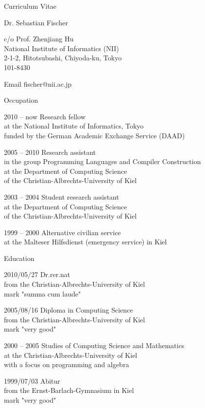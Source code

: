 \documentclass[a4paper,12pt,DIV=12]{scrartcl}
\begin{document}
\begin{cv}{Curriculum Vitae}
  \begin{cvlist}{}
  \item Dr. Sebastian Fischer
  \item
    c/o Prof. Zhenjiang Hu\\
    National Institute of Informatics (NII)\\
    2-1-2, Hitotsubashi, Chiyoda-ku, Tokyo\\
    101-8430
  \item[Email] fischer@nii.ac.jp
  \end{cvlist}
  \begin{cvlist}{Occupation}
  \item[2010 -- now]
    Research fellow\\
    at the National Institute of Informatics, Tokyo\\
    funded by the German Academic Exchange Service (DAAD)
  \item[2005 -- 2010]
    Research assistant\\
    in the group Programming Languages and Compiler Construction\\
    at the Department of Computing Science\\
    of the Christian-Albrechts-University of Kiel
  \item[2003 -- 2004]
    Student research assistant\\
    at the Department of Computing Science\\
    of the Christian-Albrechts-University of Kiel
  \item[1999 -- 2000]
    Alternative civilian service\\
    at the Malteser Hilfsdienst (emergency service) in Kiel
  \end{cvlist}
  \begin{cvlist}{Education}
  \item[2010/05/27]
    Dr.rer.nat\\
    from the Christian-Albrechts-University of Kiel\\
    mark "summa cum laude"
  \item[2005/08/16] 
    Diploma in Computing Science\\
    from the Christian-Albrechts-University of Kiel\\
    mark "very good"
  \item[2000 -- 2005] 
    Studies of Computing Science and Mathematics\\
    at the Christian-Albrechts-University of Kiel\\
    with a focus on programming and algebra
  \item[1999/07/03]
    Abitur\\
    from the Ernst-Barlach-Gymnasium in Kiel\\
    mark "very good"
  \end{cvlist}
\end{cv}
\end{document}
